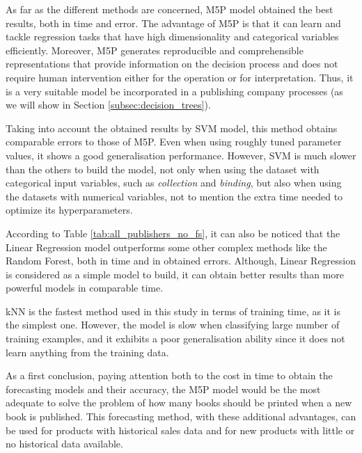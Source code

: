 \documentclass[a4paper,10pt,twocolumn,preprint,3p]{elsarticle}
\begin{document}
As far as the different methods are concerned, M5P model obtained the best results, both in time and error. The advantage of M5P is that it can learn and tackle regression
 tasks that have high dimensionality and categorical variables efficiently. Moreover, M5P generates reproducible and comprehensible representations that provide information on the decision process and does not require human intervention either for the operation or for interpretation. Thus, it is a very suitable model be incorporated in a publishing company 
processes (as we will show in Section \ref{subsec:decision_trees}).

Taking into account the obtained results by SVM model, this method obtains comparable errors to those of M5P. Even when using roughly tuned parameter values, it shows a good generalisation performance. However, SVM is much slower than the others to build the model, not only when using the dataset with categorical input variables, such as \emph{collection} and \emph{binding}, but also when using the datasets with numerical variables, not to mention the extra time needed to optimize its hyperparameters.

According to Table \ref{tab:all_publishers_no_fs}, it can also be noticed that 
the Linear Regression model outperforms some other complex methods like the 
Random Forest, both in time and in obtained errors. 
Although, Linear Regression is considered as a simple model to build, it can obtain better results than more powerful models in comparable time.

kNN is the fastest method used in this study in terms of training time, as it 
is the simplest one. However, the model is slow when classifying large number of 
training examples, and it exhibits a poor generalisation ability since it does not learn anything from the training data.


As a first conclusion, paying attention both to the cost in time to obtain the forecasting models and their accuracy, the M5P model would be the most adequate to solve the problem of how many books should be printed when a new book is published. This forecasting method, with these additional advantages, can be used for products with historical sales data and for new products with little or no historical data available.
\end{document}
